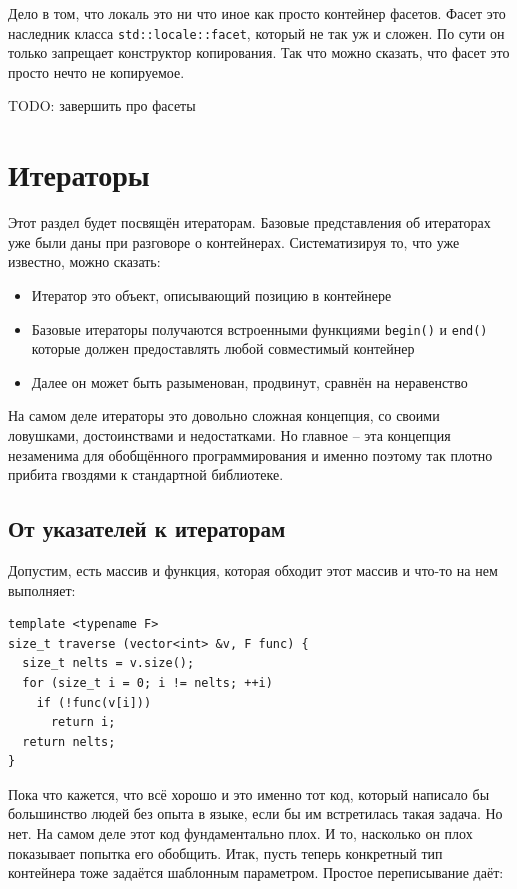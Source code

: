\documentclass[a4paper,12pt,oneside]{book}
\begin{document}
Дело в том, что локаль это ни что иное как просто контейнер фасетов. Фасет это наследник класса \lstinline!std::locale::facet!, который не так уж и сложен. По сути он только запрещает конструктор копирования. Так что можно сказать, что фасет это просто нечто не копируемое.

TODO: завершить про фасеты

\pagebreak
\section{Итераторы}\label{Iterators}

Этот раздел будет посвящён итераторам. Базовые представления об итераторах уже были даны при разговоре о контейнерах. Систематизируя то, что уже известно, можно сказать:

\begin{itemize}
\item Итератор это объект, описывающий позицию в контейнере
\item Базовые итераторы получаются встроенными функциями \lstinline!begin()! и \lstinline!end()! которые должен предоставлять любой совместимый контейнер 
\item Далее он может быть разыменован, продвинут, сравнён на неравенство
\end{itemize}

На самом деле итераторы это довольно сложная концепция, со своими ловушками, достоинствами и недостатками. Но главное -- эта концепция незаменима для обобщённого программирования и именно поэтому так плотно прибита гвоздями к стандартной библиотеке.

\subsection{От указателей к итераторам}\label{PointersToIterators}

Допустим, есть массив и функция, которая обходит этот массив и что-то на нем выполняет:

\begin{lstlisting}
template <typename F>
size_t traverse (vector<int> &v, F func) {
  size_t nelts = v.size();
  for (size_t i = 0; i != nelts; ++i)
    if (!func(v[i]))
      return i;
  return nelts;
}
\end{lstlisting}

Пока что кажется, что всё хорошо и это именно тот код, который написало бы большинство людей без опыта в языке, если бы им встретилась такая задача. Но нет. На самом деле этот код фундаментально плох. И то, насколько он плох показывает попытка его обобщить. Итак, пусть теперь конкретный тип контейнера тоже задаётся шаблонным параметром. Простое переписывание даёт:
\end{document}
